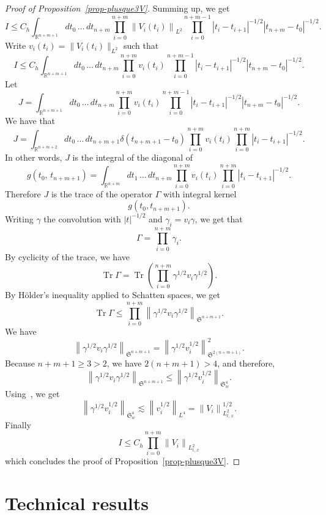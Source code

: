 \documentclass[10pt]{amsart}
\theoremstyle{definition}\newtheorem{defi}[theo]{Definition}\newtheorem{rema}[theo]{Remark}\newtheorem{exam}[theo]{Example}\newtheorem{exem}[theo]{Example}\newtheorem{nota}[theo]{Notation}
\newcommand{\R}{\mathbb{R}}
\DeclareMathOperator{\Tr}{Tr}
\newcommand{\frkS}{\mathfrak{S}}
\begin{document}
\begin{proof}[Proof of Proposition~\ref{prop-plusque3V}]
Summing up, we get
\[
I \leq C_h \int_{\R^{n+m+1}} dt_0\,\hdots\,dt_{n+m} \prod_{i=0}^{n+m} \left\|V_i(t_i)\right\|_{L^2} \prod_{i=0}^{n+m-1}\left|t_i - t_{i+1}\right|^{-1/2}\left|t_{n+m} - t_0\right|^{-1/2}.
\]
Write $v_i(t_i) = \|V_i(t_i)\|_{L^2}$ such that
\[
I \leq C_h \int_{\R^{n+m+1}} dt_0\,\hdots\,dt_{n+m} \prod_{i=0}^{n+m} v_i(t_i) \prod_{i=0}^{n+m-1}\left|t_i - t_{i+1}\right|^{-1/2}\left|t_{n+m} - t_0\right|^{-1/2}.
\]
Let
\[
J = \int_{\R^{n+m+1}} dt_0\,\hdots\,dt_{n+m} \prod_{i=0}^{n+m} v_i(t_i) \prod_{i=0}^{n+m-1}\left|t_i - t_{i+1}\right|^{-1/2}\left|t_{n+m} - t_0\right|^{-1/2}.
\]
We have that
\[
J = \int_{\R^{n+m+2}} dt_0\,\hdots\,dt_{n+m+1} \delta\left(t_{n+m+1} - t_0\right)\prod_{i=0}^{n+m} v_i(t_i) \prod_{i=0}^{n+m}\left|t_i - t_{i+1}\right|^{-1/2}.
\]
In other words, $J$ is the integral of the diagonal of
\[
g\left(t_0,\,t_{n+m+1}\right) = \int_{\R^{n+m}} dt_1 \,\hdots\,dt_{n+m} \prod_{i=0}^{n+m} v_i(t_i) \prod_{i=0}^{n+m}\left|t_i - t_{i+1}\right|^{-1/2}.
\]
Therefore $J$ is the trace of the operator $\Gamma$ with integral kernel
\[
g(t_0,t_{n+m+1}).
\]
Writing $\gamma$ the convolution with $|t|^{-1/2}$ and $\gamma_i = v_i \gamma$, we get that
\[
\Gamma = \prod_{i=0}^{n+m} \gamma_i.
\]
By cyclicity of the trace, we have
\[
\Tr\Gamma = \Tr \left(\prod_{i=0}^{n+m} \gamma^{1/2} v_i \gamma^{1/2} \right).
\]
By H\"older's inequality applied to Schatten spaces, we get
\[
\Tr\Gamma \leq \prod_{i=0}^{n+m} \left\|\gamma^{1/2} v_i \gamma^{1/2}\right\|_{\frkS^{n+m+1}}.
\]
We have
\[
\left\|\gamma^{1/2} v_i \gamma^{1/2}\right\|_{\frkS^{n+m+1}}= \left\|\gamma^{1/2} v_i^{1/2}\right\|_{\frkS^{2\left(n+m+1\right)}}^2.
\]
Because $n+m+1 \geq 3> 2$, we have $2(n+m+1) > 4$, and therefore,
\[
\left\|\gamma^{1/2} v_i \gamma^{1/2}\right\|_{\frkS^{n+m+1}}\leq \left\|\gamma^{1/2} v_i^{1/2} \right\|_{\frkS_w^{4}}.
\]
Using~\cite[Cwikel's inequality as in p~17]{FLLS}, we get
\[
\left\|\gamma^{1/2} v_i^{1/2} \right\|_{\frkS_w^{4}}\lesssim \left\|v_i^{1/2}\right\|_{L^4} = \left\|V_i\right\|_{L^2_{t,\,x}}^{1/2}.
\]
Finally
\[
I \leq C_h \prod_{i=0}^{n+m} \left\|V_i\right\|_{L^2_{t,\,x}}
\]
which concludes the proof of Proposition~\ref{prop-plusque3V}.
\end{proof}


\section{Technical results}\label{sec:tech}
\end{document}
